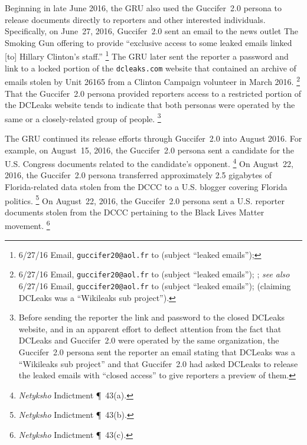 Beginning in late June 2016, the GRU also used the Guccifer~2.0 persona to release documents directly to reporters and other interested individuals.
Specifically, on June~27, 2016, Guccifer~2.0 sent an email to the news outlet The Smoking Gun offering to provide ``exclusive access to some leaked emails linked [to] Hillary Clinton's staff.''%
\footnote{6/27/16 Email, \verb+guccifer20@aol.fr+ to  (subject ``leaked emails''); }
The GRU later sent the reporter a password and link to a locked portion of the \verb+dcleaks.com+ website that contained an archive of emails stolen by Unit 26165 from a Clinton Campaign volunteer in March 2016.%
\footnote{6/27/16 Email, \verb+guccifer20@aol.fr+ to  (subject ``leaked emails''); ;
\textit{see also} 6/27/16 Email, \verb+guccifer20@aol.fr+ to  (subject ``leaked emails'');  (claiming DCLeaks was a ``Wikileaks sub project'').}
That the Guccifer~2.0 persona provided reporters access to a restricted portion of the DCLeaks website tends to indicate that both personas were operated by the same or a  closely-related group of people.%
\footnote{Before sending the reporter the link and password to the closed DCLeaks website, and in an apparent effort to deflect attention from the fact that DCLeaks and Guccifer~2.0 were operated by the same organization, the Guccifer~2.0 persona sent the reporter an email stating that DCLeaks was a ``Wikileaks sub project'' and that Guccifer~2.0 had asked DCLeaks to release the leaked emails with ``closed access'' to give reporters a preview of them.
}

The GRU continued its release efforts through Guccifer~2.0 into August 2016.
For example, on August~15, 2016, the Guccifer~2.0 persona sent a candidate for the U.S. Congress documents related to the candidate's opponent.%
\footnote{\textit{Netyksho} Indictment \P~43(a).}
On August~22, 2016, the Guccifer~2.0 persona transferred approximately 2.5 gigabytes of Florida-related data stolen from the DCCC to a U.S. blogger covering Florida politics.%
\footnote{\textit{Netyksho} Indictment \P~43(b).}
On August~22, 2016, the Guccifer~2.0 persona sent a U.S. reporter documents stolen from the DCCC pertaining to the Black Lives Matter movement.%
\footnote{\textit{Netyksho} Indictment \P~43(c).}

